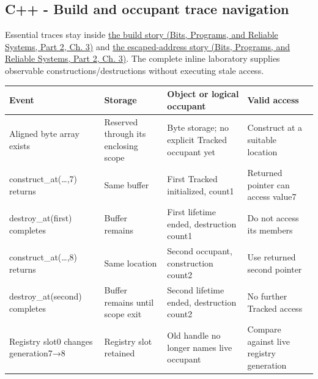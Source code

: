 \subsection{C++ - Build and occupant trace navigation}\label{appendix-92ff77d4dfdc-c---build-and-occupant-trace-navigation}

\hypertarget{appendix-92ff77d4dfdc-c---build-and-occupant-trace-navigation}{}

Essential traces stay inside \href{../01-Bits-Programs-and-Reliable-Systems-P02/main.pdf\#01-foundations-i-ch003-following-one-call-through-the-build}{the build story (Bits, Programs, and Reliable Systems, Part 2, Ch. 3)} and \href{../01-Bits-Programs-and-Reliable-Systems-P02/main.pdf\#01-foundations-i-ch003-following-an-escaped-address-through-time}{the escaped-address story (Bits, Programs, and Reliable Systems, Part 2, Ch. 3)}. The complete inline laboratory supplies observable constructions/destructions without executing stale access.

{\def\LTcaptype{none} %
\begin{longtable}[]{@{}
  >{\raggedright\arraybackslash}p{}
  >{\raggedright\arraybackslash}p{}
  >{\raggedright\arraybackslash}p{}
  >{\raggedright\arraybackslash}p{}@{}}
\toprule\noalign{}
\begin{minipage}[b]{\linewidth}\raggedright
Event
\end{minipage} & \begin{minipage}[b]{\linewidth}\raggedright
Storage
\end{minipage} & \begin{minipage}[b]{\linewidth}\raggedright
Object or logical occupant
\end{minipage} & \begin{minipage}[b]{\linewidth}\raggedright
Valid access
\end{minipage} \\
\midrule\noalign{}
\endhead
\bottomrule\noalign{}
\endlastfoot
Aligned byte array exists & Reserved through its enclosing scope & Byte storage; no explicit Tracked occupant yet & Construct at a suitable location \\
construct\_at(\ldots,7) returns & Same buffer & First Tracked initialized, count1 & Returned pointer can access value7 \\
destroy\_at(first) completes & Buffer remains & First lifetime ended, destruction count1 & Do not access its members \\
construct\_at(\ldots,8) returns & Same location & Second occupant, construction count2 & Use returned second pointer \\
destroy\_at(second) completes & Buffer remains until scope exit & Second lifetime ended, destruction count2 & No further Tracked access \\
Registry slot0 changes generation7→8 & Registry slot retained & Old handle no longer names live occupant & Compare against live registry generation \\
\end{longtable}
}

